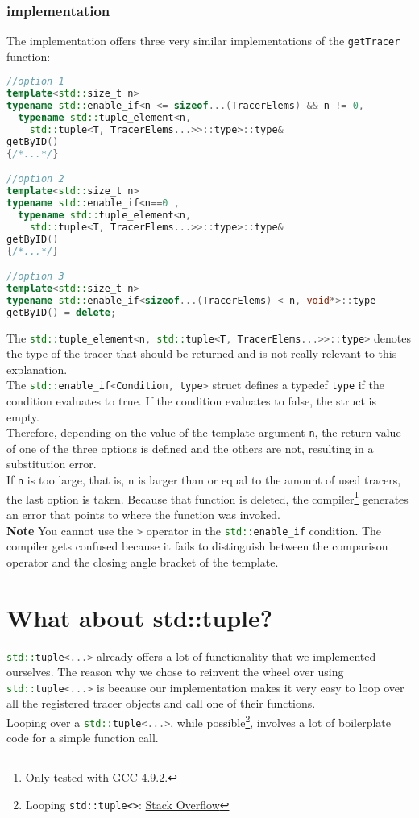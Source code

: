 \documentclass[12pt]{article}
\newcommand{\inlinecpp}[1]{\lstinline[language=c++]{#1}}
\begin{document}
\subsubsection{implementation}
The implementation offers three very similar implementations of the \inlinecpp{getTracer} function:
\begin{lstlisting}[language=c++]
//option 1
template<std::size_t n>
typename std::enable_if<n <= sizeof...(TracerElems) && n != 0,
  typename std::tuple_element<n,
    std::tuple<T, TracerElems...>>::type>::type&
getByID()
{/*...*/}

//option 2
template<std::size_t n>
typename std::enable_if<n==0 ,
  typename std::tuple_element<n,
    std::tuple<T, TracerElems...>>::type>::type&
getByID()
{/*...*/}

//option 3
template<std::size_t n>
typename std::enable_if<sizeof...(TracerElems) < n, void*>::type
getByID() = delete;
\end{lstlisting}
The \inlinecpp{std::tuple_element<n, std::tuple<T, TracerElems...>>::type>} denotes the type of the tracer that should be returned and is not really relevant to this explanation.\\
The \inlinecpp{std::enable_if<Condition, type>} struct defines a typedef \lstinline{type}\lstinline{} if the condition evaluates to true. If the condition evaluates to false, the struct is empty.\\
Therefore, depending on the value of the template argument \inlinecpp{n}, the return value of one of the three options is defined and the others are not, resulting in a substitution error.\\
If \inlinecpp{n} is too large, that is, n is larger than or equal to the amount of used tracers, the last option is taken. Because that function is deleted, the compiler\footnote{Only tested with GCC 4.9.2.} generates an error that points to where the function was invoked.\\
\textbf{Note} You cannot use the \inlinecpp{>} operator in the \inlinecpp{std::enable_if} condition. The compiler gets confused because it fails to distinguish between the comparison operator and the closing angle bracket of the template.

\section{What about std::tuple?}
\inlinecpp{std::tuple<...>} already offers a lot of functionality that we implemented ourselves. The reason why we chose to reinvent the wheel over using \inlinecpp{std::tuple<...>} is because our implementation makes it very easy to loop over all the registered tracer objects and call one of their functions.\\
Looping over a \inlinecpp{std::tuple<...>}, while possible\footnote{Looping \lstinline{std::tuple<>}: \href{http://stackoverflow.com/a/6894436}{Stack Overflow}}, involves a lot of boilerplate code for a simple function call.
\end{document}
